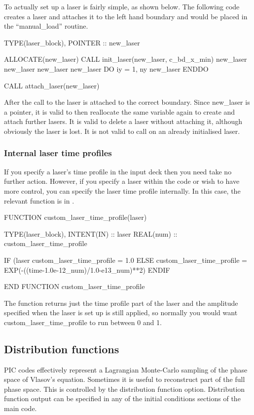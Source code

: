 To actually set up a laser is fairly simple, as shown below. The following
code creates a laser and attaches it to the left hand boundary and would
be placed in the ``manual\_load'' routine.
\begin{boxverbatim}
  TYPE(laser_block), POINTER :: new_laser

  ALLOCATE(new_laser)
  CALL init_laser(new_laser, c_bd_x_min)
  new_laser%
  new_laser%
  new_laser%
  new_laser%
  DO iy = 1, ny
    new_laser%
  ENDDO

  CALL attach_laser(new_laser)
\end{boxverbatim}
After the call to  the laser is attached to the
correct boundary. Since new\_laser is a pointer, it is valid to then reallocate
the same variable again to create and attach further lasers. It is valid to
delete a laser without attaching it, although obviously the laser is lost. It
is not valid to call  on an already initialised laser.

\subsubsection{Internal laser time profiles}
If you specify a laser's time profile in the input deck then you need take no
further action. However, if you specify a laser within the code or wish to
have more control, you can specify the laser time profile internally. In this
case, the relevant function is in
.
\begin{boxverbatim}
FUNCTION custom_laser_time_profile(laser)

  TYPE(laser_block), INTENT(IN) :: laser
  REAL(num) :: custom_laser_time_profile

  IF (laser%
    custom_laser_time_profile = 1.0
  ELSE
    custom_laser_time_profile = EXP(-((time-1.0e-12_num)/1.0-e13_num)**2)
  ENDIF

END FUNCTION custom_laser_time_profile
\end{boxverbatim}
The function returns just the time profile part of the laser and the
amplitude specified when the laser is set up is still applied, so normally you
would want custom\_laser\_time\_profile to run between 0 and 1.

\subsection{Distribution functions}
PIC codes effectively represent a Lagrangian Monte-Carlo sampling of the phase
space of Vlasov's equation. Sometimes it is useful to reconstruct part of the
full phase space. This is controlled by the distribution function option.
Distribution function output can be specified in any of the initial conditions
sections of the main code.

